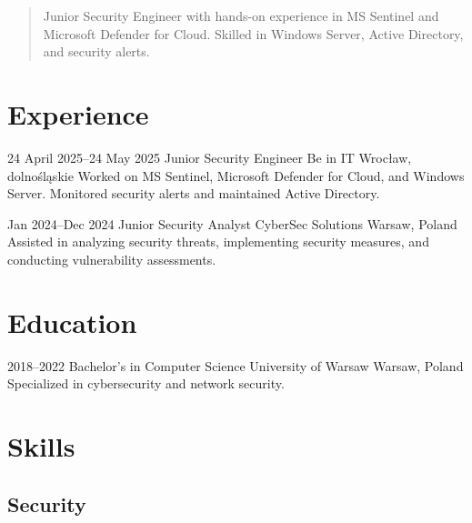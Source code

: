 




\address{City, Country}


\begin{quote}
Junior Security Engineer with hands-on experience in MS Sentinel and Microsoft Defender for Cloud. Skilled in Windows Server, Active Directory, and security alerts.
\end{quote}

\section{Experience}

\begin{entrylist}
\entry
  {24 April 2025--24 May 2025}
  {Junior Security Engineer}
  {Be in IT}
  {Wrocław, dolnośląskie}
  {Worked on MS Sentinel, Microsoft Defender for Cloud, and Windows Server. Monitored security alerts and maintained Active Directory.}
\end{entrylist}

\begin{entrylist}
\entry
  {Jan 2024--Dec 2024}
  {Junior Security Analyst}
  {CyberSec Solutions}
  {Warsaw, Poland}
  {Assisted in analyzing security threats, implementing security measures, and conducting vulnerability assessments.}
\end{entrylist}


\section{Education}

\begin{entrylist}
\entry
  {2018--2022}
  {Bachelor's in Computer Science}
  {University of Warsaw}
  {Warsaw, Poland}
  {Specialized in cybersecurity and network security.}
\end{entrylist}


\section{Skills}

\subsection{Security}

